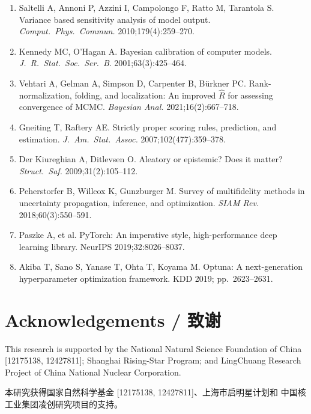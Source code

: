 \documentclass[11pt,a4paper]{article}
\begin{document}
\begin{enumerate}
      predictive uncertainty estimation using deep ensembles. NeurIPS
      2017;30.
\item Saltelli A, Annoni P, Azzini I, Campolongo F, Ratto M,
      Tarantola S. Variance based sensitivity analysis of model output.
      \textit{Comput.\ Phys.\ Commun.} 2010;179(4):259--270.
\item Kennedy MC, O'Hagan A. Bayesian calibration of computer models.
      \textit{J.\ R.\ Stat.\ Soc.\ Ser.\ B}. 2001;63(3):425--464.
\item Vehtari A, Gelman A, Simpson D, Carpenter B, B{\"u}rkner PC.
      Rank-normalization, folding, and localization: An improved
      $\hat{R}$ for assessing convergence of MCMC. \textit{Bayesian
      Anal.} 2021;16(2):667--718.
\item Gneiting T, Raftery AE. Strictly proper scoring rules, prediction,
      and estimation. \textit{J.\ Am.\ Stat.\ Assoc.}
      2007;102(477):359--378.
\item Der Kiureghian A, Ditlevsen O. Aleatory or epistemic? Does it
      matter? \textit{Struct.\ Saf.} 2009;31(2):105--112.
\item Peherstorfer B, Willcox K, Gunzburger M. Survey of multifidelity
      methods in uncertainty propagation, inference, and optimization.
      \textit{SIAM Rev.} 2018;60(3):550--591.
\item Paszke A, et al. PyTorch: An imperative style, high-performance
      deep learning library. NeurIPS 2019;32:8026--8037.
\item Akiba T, Sano S, Yanase T, Ohta T, Koyama M. Optuna: A
      next-generation hyperparameter optimization framework. KDD 2019;
      pp.\ 2623--2631.
\end{enumerate}

\section*{Acknowledgements / 致谢}

This research is supported by the National Natural Science Foundation
of China [12175138, 12427811]; Shanghai Rising-Star Program; and
LingChuang Research Project of China National Nuclear Corporation.

本研究获得国家自然科学基金 [12175138, 12427811]、上海市启明星计划和
中国核工业集团凌创研究项目的支持。
\end{document}
